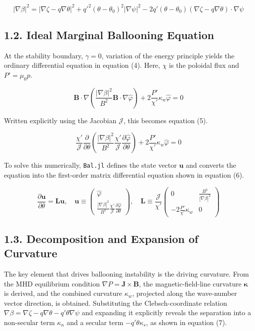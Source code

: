 \documentclass[11pt,a4paper]{article}
\begin{document}
\[ |\nabla\beta|^2 = |\nabla\zeta - q\nabla\theta|^2 + q'^2(\theta - \theta_0)^2 |\nabla\psi|^2 - 2q'(\theta - \theta_0)(\nabla\zeta - q\nabla\theta) \cdot \nabla\psi \tag{3} \]

\subsection{1.2. Ideal Marginal Ballooning Equation}\label{ideal-marginal-ballooning-equation}

At the stability boundary, \(\gamma=0\), variation of the energy principle yields
the ordinary differential equation in equation (4). Here, \(\chi\) is the poloidal
flux and \(P' = \mu_0 p\).

\[ \mathbf{B} \cdot \nabla \left( \frac{|\nabla\beta|^2}{B^2} \mathbf{B} \cdot \nabla \hat{\varphi} \right) + 2 \frac{P'}{\chi'} \kappa_w \hat{\varphi} = 0 \tag{4} \]

Written explicitly using the Jacobian \(\mathcal{J}\), this becomes equation (5).

\[ \frac{\chi'}{\mathcal{J}} \frac{\partial}{\partial\theta} \left( \frac{|\nabla\beta|^2}{B^2} \frac{\chi'}{\mathcal{J}} \frac{\partial \hat{\varphi}}{\partial\theta} \right) + 2 \frac{P'}{\chi'} \kappa_w \hat{\varphi} = 0 \tag{5} \]

To solve this numerically, \texttt{Bal.jl} defines the state vector \(\mathbf{u}\)
and converts the equation into the first-order matrix differential equation shown
in equation (6).

\[ \frac{\partial \mathbf{u}}{\partial\theta} = \mathbf{L}\mathbf{u}, \quad \mathbf{u} \equiv \begin{pmatrix} \hat{\varphi} \\ \frac{|\nabla\beta|^2}{B^2} \frac{\chi'}{\mathcal{J}} \frac{\partial \hat{\varphi}}{\partial\theta} \end{pmatrix}, \quad \mathbf{L} \equiv \frac{\mathcal{J}}{\chi'} \begin{pmatrix} 0 & \frac{B^2}{|\nabla\beta|^2} \\ -2\frac{P'}{\chi'} \kappa_w & 0 \end{pmatrix} \tag{6} \]

\subsection{1.3. Decomposition and Expansion of Curvature}\label{decomposition-and-expansion-of-curvature}

The key element that drives ballooning instability is the driving curvature. From
the MHD equilibrium condition \(\nabla P = \mathbf{J} \times \mathbf{B}\), the
magnetic-field-line curvature \(\boldsymbol{\kappa}\) is derived, and the combined
curvature \(\kappa_w\), projected along the wave-number vector direction, is
obtained. Substituting the Clebsch-coordinate relation
\(\nabla\beta = \nabla\zeta - q\nabla\theta - q'\theta\nabla\psi\) and expanding
it explicitly reveals the separation into a non-secular term \(\kappa_n\) and a
secular term \(-q'\theta\kappa_s\), as shown in equation (7).
\end{document}
